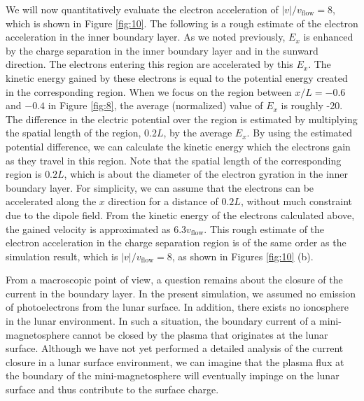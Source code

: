 \documentclass[draft,jgrga]{agutex2015}
\begin{document}
\begin{article}
We will now quantitatively evaluate the electron acceleration of $|v|/v_\mathrm{flow}=8$, which
is shown in Figure \ref{fig:10}. 
The following is a rough estimate of the electron acceleration in the inner boundary layer.
As we noted previously, 
$E_x$ is enhanced by the charge separation 
in the inner boundary layer and in the sunward direction.
The electrons entering this region are accelerated by this $E_x$.
The kinetic energy gained by these electrons is equal to 
the potential energy created in the corresponding region.
When we focus on the region between $x/L=-0.6$ and $-0.4$ in Figure \ref{fig:8}, 
the average (normalized) value of $E_x$ is roughly -20.
The difference in the electric potential over the region is 
estimated by multiplying the spatial length of the region, 
$0.2 L$, by the average $E_x$.
By using the estimated potential difference, 
we can calculate the kinetic energy which the electrons gain as they travel in this region. 
Note that 
the spatial length of the corresponding region is $0.2 L$, which is about the diameter of 
the electron gyration in the inner boundary layer. 
For simplicity, we can assume that the electrons can be accelerated along the $x$ direction for a distance of $0.2 L$,
without much constraint due to the dipole field.
From the kinetic energy of the electrons calculated above, 
the gained velocity is approximated as $6.3v_\mathrm{flow}$. 
This rough estimate of the electron acceleration in the charge separation region 
is of the same order as the simulation result, which is 
$|v|/v_\mathrm{flow}=8$, as shown in Figures \ref{fig:10} (b). 


From a macroscopic point of view, 
a question remains about the closure of the current in the boundary layer.
In the present simulation, 
we assumed no emission of photoelectrons from the lunar surface.
In addition, there exists no ionosphere in the lunar environment.
In such a situation, 
the boundary current of a mini-magnetosphere 
cannot be closed by the plasma that originates at the lunar surface.
Although we have not yet performed a detailed analysis of the current closure in a
lunar surface environment, 
we can imagine that the plasma flux 
at the boundary of the mini-magnetosphere
will eventually impinge on the lunar surface and thus
contribute to the surface charge.


\end{article}
\end{document}

